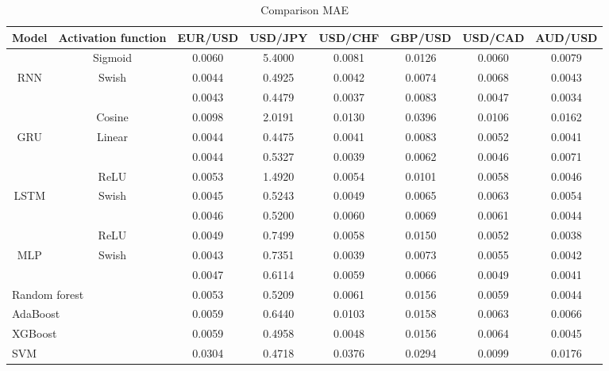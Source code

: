 \documentclass{ieeeaccess}
\begin{document}
\begin{table}[t]
  \caption{Comparison MAE}
  \small
  \centering
  \begin{tabular*}{0.9\textwidth}{c @{\extracolsep{\fill}} ccccccc}
    \hline
    \textbf{Model} & \textbf{Activation function} & \textbf{EUR/USD} & \textbf{USD/JPY} & \textbf{USD/CHF} & \textbf{GBP/USD} & \textbf{USD/CAD} & \textbf{AUD/USD} \\
    \hline

          & Sigmoid & 0.0060 & 5.4000 & 0.0081 & 0.0126 & 0.0060 & 0.0079 \\
    RNN   & Swish & 0.0044 & 0.4925 & 0.0042 & 0.0074 & 0.0068 & 0.0043 \\
          & \cite{Munkhdalai2019} & 0.0043 & 0.4479 & 0.0037 & 0.0083 & 0.0047 & 0.0034 \\
    \hline
          & Cosine & 0.0098 & 2.0191 & 0.0130 & 0.0396 & 0.0106 & 0.0162 \\
    GRU   & Linear & 0.0044 & 0.4475 & 0.0041 & 0.0083 & 0.0052 & 0.0041 \\
          & \cite{Munkhdalai2019} & 0.0044 & 0.5327 & 0.0039 & 0.0062 & 0.0046 & 0.0071 \\
    \hline
          & ReLU & 0.0053 & 1.4920 & 0.0054 & 0.0101 & 0.0058 & 0.0046 \\
    LSTM  & Swish & 0.0045 & 0.5243 & 0.0049 & 0.0065 & 0.0063 & 0.0054 \\
          & \cite{Munkhdalai2019} & 0.0046 & 0.5200 & 0.0060 & 0.0069 & 0.0061 & 0.0044 \\
    \hline

          & ReLU & 0.0049 & 0.7499 & 0.0058 & 0.0150 & 0.0052 & 0.0038 \\
    MLP   & Swish & 0.0043 & 0.7351 & 0.0039 & 0.0073 & 0.0055 & 0.0042 \\
          & \cite{Munkhdalai2019} & 0.0047 & 0.6114 & 0.0059 & 0.0066 & 0.0049 & 0.0041 \\
          

    \hline

    \multicolumn{2}{l}{Random forest} & 0.0053 & 0.5209 & 0.0061 & 0.0156 & 0.0059 & 0.0044 \\
    \multicolumn{2}{l}{AdaBoost} & 0.0059 & 0.6440 & 0.0103 & 0.0158 & 0.0063 & 0.0066 \\
    \multicolumn{2}{l}{XGBoost} & 0.0059 & 0.4958 & 0.0048 & 0.0156 & 0.0064 & 0.0045 \\
    \multicolumn{2}{l}{SVM} & 0.0304 & 0.4718 & 0.0376 & 0.0294 & 0.0099 & 0.0176 \\


\end{tabular*}
\end{table}
\end{document}
